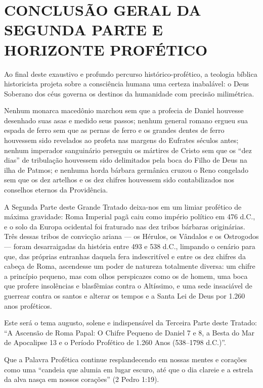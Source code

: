 \section{CONCLUSÃO GERAL DA SEGUNDA PARTE E HORIZONTE PROFÉTICO}


Ao final deste exaustivo e profundo percurso histórico-profético, a teologia bíblica historicista projeta sobre a consciência humana uma certeza inabalável: o Deus Soberano dos céus governa os destinos da humanidade com precisão milimétrica.

Nenhum monarca macedônio marchou sem que a profecia de Daniel houvesse desenhado suas asas e medido seus passos; nenhum general romano ergueu sua espada de ferro sem que as pernas de ferro e os grandes dentes de ferro houvessem sido revelados ao profeta nas margens do Eufrates séculos antes; nenhum imperador sanguinário perseguiu os mártires de Cristo sem que os ``dez dias'' de tribulação houvessem sido delimitados pela boca do Filho de Deus na ilha de Patmos; e nenhuma horda bárbara germânica cruzou o Reno congelado sem que os dez artelhos e os dez chifres houvessem sido contabilizados nos conselhos eternos da Providência.

A Segunda Parte deste Grande Tratado deixa-nos em um limiar profético de máxima gravidade:
Roma Imperial pagã caiu como império político em 476 d.C., e o solo da Europa ocidental foi fraturado nas dez tribos bárbaras originárias. Três dessas tribos de convicção ariana — os Hérulos, os Vândalos e os Ostrogodos — foram desarraigadas da história entre 493 e 538 d.C., limpando o cenário para que, das próprias entranhas daquela fera indescritível e entre os dez chifres da cabeça de Roma, ascendesse um poder de natureza totalmente diversa: um chifre a princípio pequeno, mas com olhos perspicazes como os de homem, uma boca que profere insolências e blasfêmias contra o Altíssimo, e uma sede insaciável de guerrear contra os santos e alterar os tempos e a Santa Lei de Deus por 1.260 anos proféticos.

Este será o tema augusto, solene e indispensável da Terceira Parte deste Tratado: ``A Ascensão de Roma Papal: O Chifre Pequeno de Daniel 7 e 8, a Besta do Mar de Apocalipse 13 e o Período Profético de 1.260 Anos (538–1798 d.C.)''.

Que a Palavra Profética continue resplandecendo em nossas mentes e corações como uma ``candeia que alumia em lugar escuro, até que o dia clareie e a estrela da alva nasça em nossos corações'' (2 Pedro 1:19).